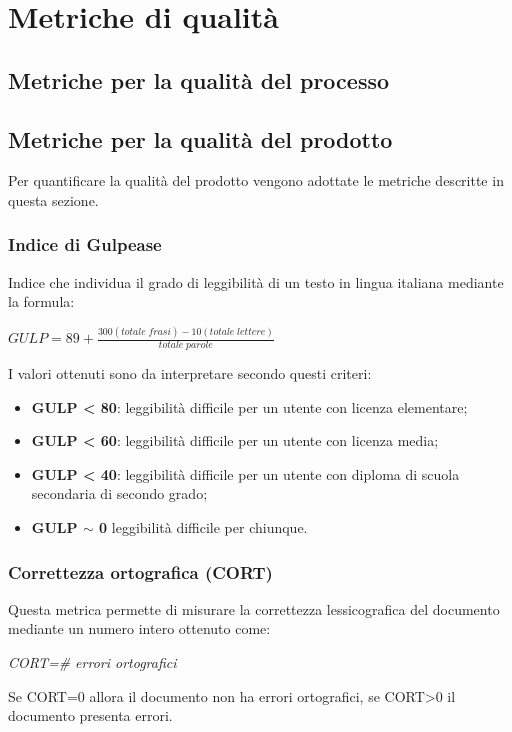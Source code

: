\appendix
\section{Metriche di qualità}

\subsection{Metriche per la qualità del processo}

\subsection{Metriche per la qualità del prodotto}
Per quantificare la qualità del prodotto vengono adottate le metriche descritte in questa sezione.
\subsubsection{Indice di Gulpease} 
Indice che individua il grado di leggibilità di un testo in lingua italiana mediante la formula:
\begin{center}
    \(GULP=89+\frac{300(totale\; frasi)-10(totale\; lettere)}{totale\; parole}\)
\end{center}
I valori ottenuti sono da interpretare secondo questi criteri:
\begin{itemize}
    \item \textbf{GULP < 80}: leggibilità difficile per un utente con licenza elementare;
    \item \textbf{GULP < 60}: leggibilità difficile per un utente con licenza media;
    \item \textbf{GULP < 40}: leggibilità difficile per un utente con diploma di scuola secondaria di secondo grado;
    \item \textbf{GULP \(\sim\) 0} leggibilità difficile per chiunque.
\end{itemize}

\subsubsection{Correttezza ortografica (CORT)}
Questa metrica permette di misurare la correttezza lessicografica del documento mediante un numero intero ottenuto come:
\begin{center}
    \textit{CORT=\# errori ortografici}
\end{center}
Se CORT=0 allora il documento non ha errori ortografici, se CORT>0 il documento presenta errori.